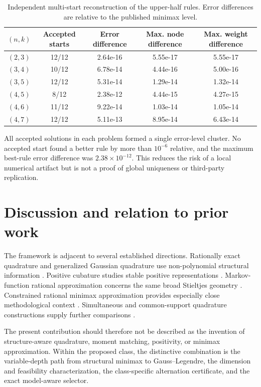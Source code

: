 \documentclass[preprint,12pt]{elsarticle}
\theoremstyle{remark}
\begin{document}
\begin{table}[ht]
\centering
\caption{Independent multi-start reconstruction of the upper-half
rules. Error differences are relative to the published minimax level.}
\label{tab:multistart}
\scriptsize
\begin{tabular}{ccccc}
\toprule
\((n,k)\) & Accepted starts & Error difference &
Max. node difference & Max. weight difference\\
\midrule
$(2,3)$ & 12/12 & 2.64e-16 & 5.55e-17 & 5.55e-17 \\
$(3,4)$ & 10/12 & 6.78e-14 & 4.44e-16 & 5.00e-16 \\
$(3,5)$ & 12/12 & 5.31e-14 & 1.29e-14 & 1.32e-14 \\
$(4,5)$ & 8/12 & 2.38e-12 & 4.44e-15 & 4.27e-15 \\
$(4,6)$ & 11/12 & 9.22e-14 & 1.03e-14 & 1.05e-14 \\
$(4,7)$ & 12/12 & 5.11e-13 & 8.95e-14 & 6.43e-14 \\
\bottomrule
\end{tabular}
\end{table}

All accepted solutions in each problem formed a single error-level
cluster. No accepted start found a better rule by more than
\(10^{-6}\) relative, and the maximum best-rule error difference was
\(2.38\times10^{-12}\). This reduces the risk of a local numerical
artifact but is not a proof of global uniqueness or third-party
replication.

\section{Discussion and relation to prior work}

The framework is adjacent to several established directions.
Rationally exact quadrature and generalized Gaussian quadrature use
non-polynomial structural information \cite{gautschi1993,huybrechs2017}.
Positive cubature studies stable positive representations
\cite{glaubitz2020}. Markov-function rational approximation concerns the
same broad Stieltjes geometry \cite{beckermann2021}. Constrained rational
minimax approximation provides especially close methodological context
\cite{zhang2025}. Simultaneous and common-support quadrature constructions
supply further comparisons \cite{vanassche2023,bravo2023}.

The present contribution should therefore not be described as the
invention of structure-aware quadrature, moment matching, positivity, or
minimax approximation. Within the proposed class, the distinctive
combination is the variable-depth path from structural minimax to
Gauss--Legendre, the dimension and feasibility characterization, the
class-specific alternation certificate, and the exact model-aware
selector.
\end{document}
